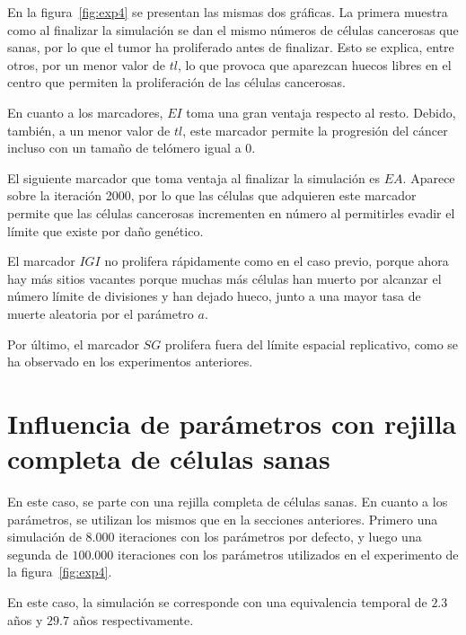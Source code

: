 En la figura~\ref{fig:exp4} se presentan las mismas dos gráficas. La primera muestra como
al finalizar la simulación se dan el mismo números de células cancerosas que sanas, por
lo que el tumor ha proliferado antes de finalizar. Esto se explica, entre otros, por
un menor valor de $tl$, lo que provoca que aparezcan huecos libres en el centro que
permiten la proliferación de las células cancerosas.

En cuanto a los marcadores, $EI$ toma una gran ventaja respecto al resto. Debido, también,
a un menor valor de $tl$, este marcador permite la progresión del cáncer incluso con un tamaño de telómero igual a $0$.

El siguiente marcador que toma ventaja al finalizar la simulación es $EA$. Aparece sobre la iteración 2000,
por lo que las células que adquieren este marcador permite que las células cancerosas incrementen en número
al permitirles evadir el límite que existe por daño genético.

El marcador $IGI$ no prolifera rápidamente como en el caso previo, porque ahora hay más sitios vacantes
porque muchas más células han muerto por alcanzar el número límite de divisiones y han dejado hueco,
junto a una mayor tasa de muerte aleatoria por el parámetro $a$.

Por último, el marcador $SG$ prolifera fuera del límite espacial replicativo, como
se ha observado en los experimentos anteriores.

\section{Influencia de parámetros con rejilla completa de células sanas}

En este caso, se parte con una rejilla completa de células sanas. En cuanto a los parámetros,
se utilizan los mismos que en la secciones anteriores. Primero una simulación de $8.000$ iteraciones
con los parámetros por defecto, y luego una segunda de $100.000$ iteraciones con los parámetros
utilizados en el experimento de la figura~\ref{fig:exp4}.

En este caso, la simulación se corresponde con una equivalencia temporal
de $2.3$ años y $29.7$ años respectivamente.

